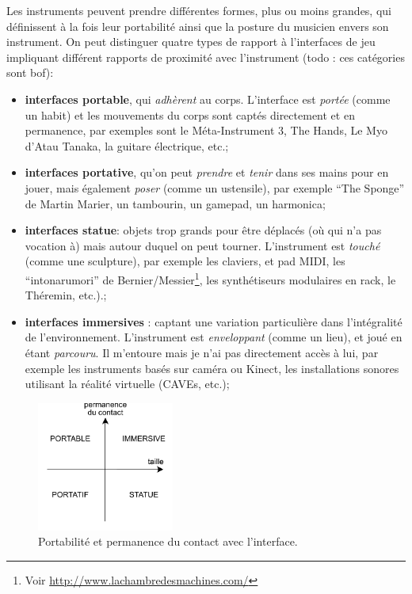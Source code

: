 \noindent Les instruments peuvent prendre différentes formes, plus ou moins grandes, qui définissent à la fois leur portabilité ainsi que la posture du musicien envers son instrument. On peut distinguer quatre types de rapport à l'interfaces de jeu impliquant différent rapports de proximité avec l'instrument (todo : ces catégories sont bof):
\vspace{-1em}
\begin{itemize}[noitemsep]
	\item \textbf{interfaces portable}, qui \textit{adhèrent} au corps. L'interface est \textit{portée} (comme un habit) et les mouvements du corps sont captés directement et en permanence, par exemples sont le Méta-Instrument 3, The Hands, Le Myo d'Atau Tanaka, la guitare électrique, etc.;
	\item \textbf{interfaces portative}, qu'on peut \textit{prendre} et \textit{tenir} dans ses mains pour en jouer, mais également \textit{poser} (comme un ustensile), par exemple ``The Sponge'' de Martin Marier, un tambourin, un gamepad, un harmonica;
	\item \textbf{interfaces statue}: objets trop grands pour être déplacés (où qui n'a pas vocation à) mais autour duquel on peut tourner. L'instrument est \textit{touché} (comme une sculpture), par exemple les claviers, et pad \gls{MIDI}, les ``intonarumori'' de Bernier/Messier\footnote{Voir \url{http://www.lachambredesmachines.com/}}, les synthétiseurs modulaires en rack, le Théremin, etc.).;
	\item \textbf{interfaces immersives} : captant une variation particulière dans l'intégralité de l'environnement. L'instrument est \textit{enveloppant} (comme un lieu), et joué en étant \textit{parcouru}. Il m'entoure mais je n'ai pas directement accès à lui, par exemple les instruments basés sur caméra ou Kinect, les installations sonores utilisant la réalité virtuelle (CAVEs, etc.);
\end{itemize}
\begin{figure}
	\vspace{-1em}
	\captionsetup{format=plain}
	\centering
 	\includegraphics[width=0.4\textwidth]{gfx/05_interfaces/interface-portabilite.pdf}
	\caption[Portabilité et permanence du contact avec l'interface.]{Portabilité et permanence du contact avec l'interface.}
 	\label{fig:interfaces:portabilite}
\end{figure}
